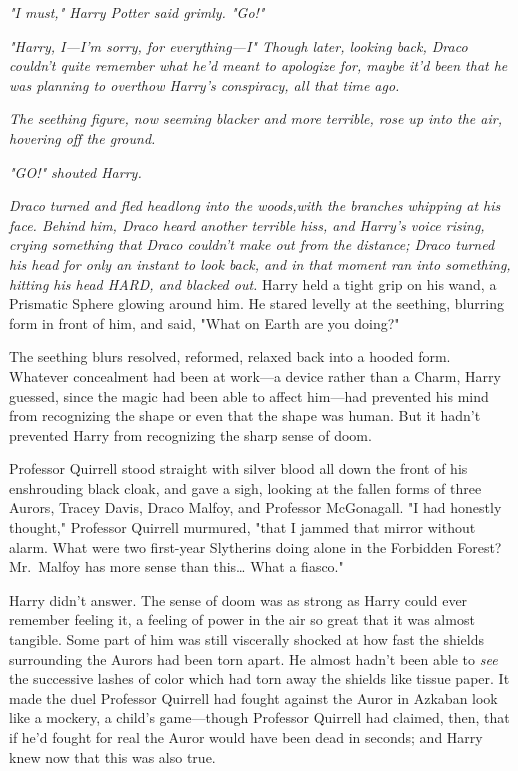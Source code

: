 \emph{"I must," Harry Potter said grimly. "Go!"}

\emph{"Harry, I---I'm sorry, for everything---I" Though later, looking back, Draco couldn't quite remember what he'd meant to apologize for, maybe it'd been that he was planning to overthow Harry's conspiracy, all that time ago.}

\emph{The seething figure, now seeming blacker and more terrible, rose up into the air, hovering off the ground.}

\emph{"GO!" shouted Harry.}

\emph{Draco turned and fled headlong into the woods,with the branches whipping at his face. Behind him, Draco heard another terrible hiss, and Harry's voice rising, crying something that Draco couldn't make out from the distance; Draco turned his head for only an instant to look back, and in that moment ran into something, hitting his head HARD, and blacked out.}
\sbreak
Harry held a tight grip on his wand, a Prismatic Sphere glowing around him. He stared levelly at the seething, blurring form in front of him, and said, "What on Earth are you doing?"

The seething blurs resolved, reformed, relaxed back into a hooded form. Whatever concealment had been at work---a device rather than a Charm, Harry guessed, since the magic had been able to affect him---had prevented his mind from recognizing the shape or even that the shape was human. But it hadn't prevented Harry from recognizing the sharp sense of doom.

Professor Quirrell stood straight with silver blood all down the front of his enshrouding black cloak, and gave a sigh, looking at the fallen forms of three Aurors, Tracey Davis, Draco Malfoy, and Professor McGonagall. "I had honestly thought," Professor Quirrell murmured, "that I jammed that mirror without alarm. What were two first-year Slytherins doing alone in the Forbidden Forest? Mr.~Malfoy has more sense than this{\ldots} What a fiasco."

Harry didn't answer. The sense of doom was as strong as Harry could ever remember feeling it, a feeling of power in the air so great that it was almost tangible. Some part of him was still viscerally shocked at how fast the shields surrounding the Aurors had been torn apart. He almost hadn't been able to \emph{see} the successive lashes of color which had torn away the shields like tissue paper. It made the duel Professor Quirrell had fought against the Auror in Azkaban look like a mockery, a child's game---though Professor Quirrell had claimed, then, that if he'd fought for real the Auror would have been dead in seconds; and Harry knew now that this was also true.

